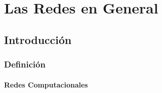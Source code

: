 \documentclass[12pt, fleqn]{report}                             %
\theoremstyle{break}                                            %
\begin{document}
\restoregeometry                                                    %
\nopagecolor                                                        %




\tableofcontents{}
\label{sec:Index}

\clearpage




\part{Las Redes en General}
\clearpage

    
    \chapter{Introducción}


        \clearpage
        \section{Definición}

            \subsection{Redes Computacionales}
\end{document}
